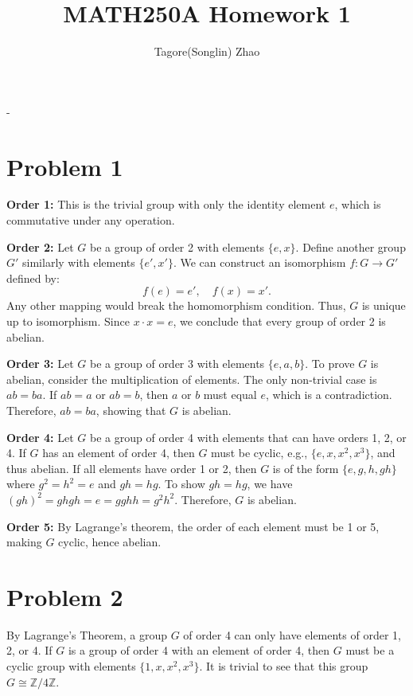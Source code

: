 \documentclass{article}
\begin{document}
\title{MATH250A Homework 1}
\author{Tagore(Songlin) Zhao}
\date{}
\maketitle-

\section*{Problem 1}


\textbf{Order 1:} This is the trivial group with only the identity element \( e \), which is commutative under any operation.

\textbf{Order 2:} Let \( G \) be a group of order 2 with elements \( \{e, x\} \). Define another group \( G' \) similarly with elements \( \{e', x'\} \). We can construct an isomorphism \( f: G \to G' \) defined by:
\[
f(e) = e', \quad f(x) = x'.
\]
Any other mapping would break the homomorphism condition. Thus, \( G \) is unique up to isomorphism. Since \( x \cdot x = e \), we conclude that every group of order 2 is abelian.

\textbf{Order 3:} Let \( G \) be a group of order 3 with elements \( \{e, a, b\} \). To prove \( G \) is abelian, consider the multiplication of elements. The only non-trivial case is \( ab = ba \). If \( ab = a \) or \( ab = b \), then \( a \) or \( b \) must equal \( e \), which is a contradiction. Therefore, \( ab = ba \), showing that \( G \) is abelian.

\textbf{Order 4:} Let \( G \) be a group of order 4 with elements that can have orders 1, 2, or 4. If \( G \) has an element of order 4, then \( G \) must be cyclic, e.g., \( \{e, x, x^2, x^3\} \), and thus abelian. If all elements have order 1 or 2, then \( G \) is of the form \( \{e, g, h, gh\} \) where \( g^2 = h^2 = e \) and \( gh = hg \). To show 
\( gh = hg \), we have \( (gh)^{2} = ghgh = e = gghh = g^{2}h^{2} \). Therefore, \( G \) is abelian.

\textbf{Order 5:} By Lagrange's theorem, the order of each element must be 1 or 5, making \( G \) cyclic, hence abelian.


\section*{Problem 2}

By Lagrange's Theorem, a group \( G \) of order 4 can only have elements of order 1, 2, or 4. If \( G \) is a group of order 4 with an element of order 4, then \( G \) must be a cyclic group with elements \( \{1, x, x^2, x^3\} \). It is trivial to see that this group \( G \cong \mathbb{Z}/4\mathbb{Z} \).
\end{document}
